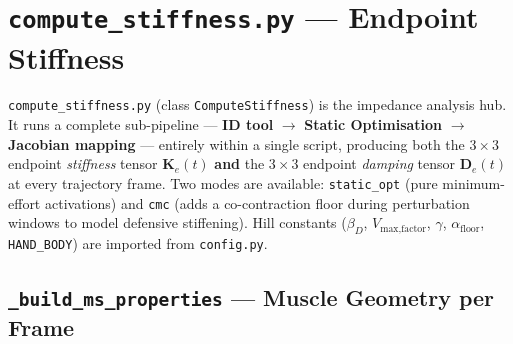 \documentclass[11pt,a4paper]{article}
\newcommand{\py}[1]{\texttt{\color{PipeBlue}#1}}
\newcommand{\file}[1]{\texttt{\color{PipePurple}#1}}
\begin{document}
\section{\texttt{compute\_stiffness.py} — Endpoint Stiffness}

\file{compute\_stiffness.py} (class \py{ComputeStiffness}) is the impedance
analysis hub.  It runs a complete sub-pipeline — \textbf{ID tool} $\to$
\textbf{Static Optimisation} $\to$ \textbf{Jacobian mapping} — entirely within a
single script, producing both the $3\times3$ endpoint \emph{stiffness} tensor
$\bm{K}_e(t)$ \textbf{and} the $3\times3$ endpoint \emph{damping} tensor
$\bm{D}_e(t)$ at every trajectory frame.  Two modes are available:
\texttt{static\_opt} (pure minimum-effort activations) and \texttt{cmc}
(adds a co-contraction floor during perturbation windows to model defensive
stiffening). Hill constants ($\beta_D$, $V_\text{max,factor}$, $\gamma$,
$\alpha_\text{floor}$, \py{HAND\_BODY}) are imported from \file{config.py}.

\subsection{\texttt{\_build\_ms\_properties} — Muscle Geometry per Frame}
\end{document}
